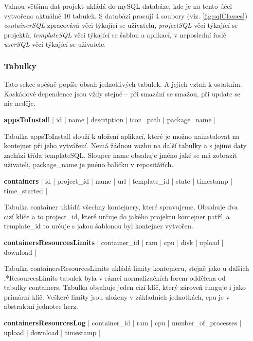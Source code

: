 \documentclass[a4paper,oneside,12pt]{report}
\begin{document}
Valnou většinu dat projekt ukládá do mySQL databáze, kde je na tento účel vytvořeno aktuálně 10 tabulek.
S databází pracují 4 soubory (viz. \ref{fig:sqlClasses}) \textit{containerSQL} zpracovává věci týkající se uživatelů, \textit{projectSQL} věci týkající se projektů, \textit{templateSQL} věci týkající se šablon a aplikací, v neposlední řadě \textit{userSQL} věci týkající se uživatele.

\subsubsection{Tabulky}

Tato sekce spěšně popíše obsah jednotlivých tabulek. A jejich vztah k ostatním. Kaskádové dependence jsou vždy stejné -- při smazání se smažou, při update se nic neděje.

\vspace{0.3cm}
\noindent
\textbf{appsToInstall} | id | name | description | icon\_path | package\_name |

Tabulka appsToInstall slouží k uložení aplikací, které je možno nainstalovat na kontejner při jeho vytváření.
Nemá žádnou vazbu na další tabulky a s jejími daty zachází třída templateSQL.
Sloupec name obsahuje jméno jaké se má zobrazit uživateli, package\_name je jméno balíčku v repositářích.

\vspace{0.3cm}
\noindent
\textbf{containers} | id | project\_id | name | url | template\_id | state | timestamp \linebreak[4] | time\_started |

Tabulka container ukládá všechny kontejnery, které spravujeme.
Obsahuje dva cizí klíče a to project\_id, které určuje do jakého projektu kontejner patří, a template\_id to určuje s jakou šablonou byl kontejner vytvořen.


\vspace{0.3cm}
\noindent
\textbf{containersResourcesLimits} | container\_id | ram | cpu | disk | upload | download |

Tabulka containersResourcesLimits ukládá limity kontejneru, stejně jako u dalších .*ResourcesLimits tabulek byla v rámci normalizačních forem oddělena od tabulky containers.
Tabulka obsahuje jeden cizí klíč, který zároveň funguje i jako primární klíč.
Veškeré limity jsou uloženy v základních jednotkách, cpu je v abstraktní jednotce herz.

\vspace{0.3cm}
\noindent
\textbf{containersResourcesLog} | container\_id | ram | cpu | number\_of\_processes | upload | download | timestamp |
\end{document}
